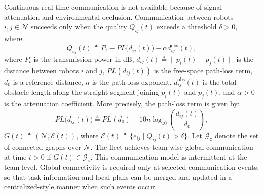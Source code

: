 Continuous real-time communication is not available because of signal
attenuation and environmental occlusion. Communication between robots
$i, j \in \mathcal{N}$ succeeds only when the quality $Q_{ij}(t)$ exceeds a
threshold $\delta > 0$, where:
\begin{equation}
Q_{ij}(t) \triangleq
P_t - PL\bigl(d_{ij}(t)\bigr) - \alpha d_{ij}^{\mathrm{obs}}(t),
\label{ch05:eq:comm-quality}
\end{equation}
where $P_t$ is the transmission power in dB,
$d_{ij}(t) \triangleq \|p_i(t) - p_j(t)\|$ is the distance between robots $i$
and $j$, $PL(d_{ij}(t))$ is the free-space path-loss term, $d_0$ is a reference
distance, $n$ is the path-loss exponent, $d_{ij}^{\mathrm{obs}}(t)$ is the
total obstacle length along the straight segment joining $p_i(t)$ and $p_j(t)$,
and $\alpha > 0$ is the attenuation coefficient. More precisely, the path-loss
term is given by:
\begin{equation}
PL\bigl(d_{ij}(t)\bigr) \triangleq
PL(d_0) + 10 n \log_{10}\!\left(\frac{d_{ij}(t)}{d_0}\right),
\label{ch05:eq:path-loss}
\end{equation}
$G(t) \triangleq (\mathcal{N}, \mathcal{E}(t))$, where
$\mathcal{E}(t) \triangleq
\{e_{ij} \mid Q_{ij}(t) > \delta\}$.
Let $\mathcal{G}_{\texttt{c}}$ denote the set of connected graphs over
$\mathcal{N}$. The fleet achieves team-wise global communication at time
$t > 0$ if $G(t) \in \mathcal{G}_{\texttt{c}}$. This communication model is
intermittent at the team level. Global connectivity is required only at selected
communication events, so that task information and local plans can be merged and
updated in a centralized-style manner when such events occur.


